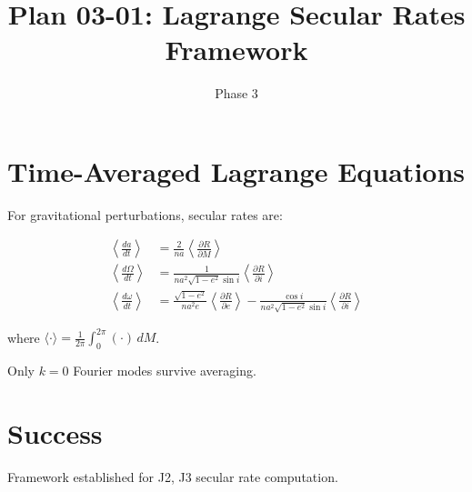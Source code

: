 \documentclass[11pt]{article}
\title{Plan 03-01: Lagrange Secular Rates Framework}
\date{Phase 3}
\begin{document}
\maketitle

\section{Time-Averaged Lagrange Equations}

For gravitational perturbations, secular rates are:

\begin{align}
\left\langle\frac{da}{dt}\right\rangle &= \frac{2}{na}\left\langle\frac{\partial R}{\partial M}\right\rangle\\
\left\langle\frac{d\Omega}{dt}\right\rangle &= \frac{1}{na^2\sqrt{1-e^2}\sin i}\left\langle\frac{\partial R}{\partial i}\right\rangle\\
\left\langle\frac{d\omega}{dt}\right\rangle &= \frac{\sqrt{1-e^2}}{na^2 e}\left\langle\frac{\partial R}{\partial e}\right\rangle - \frac{\cos i}{na^2\sqrt{1-e^2}\sin i}\left\langle\frac{\partial R}{\partial i}\right\rangle
\end{align}

where $\langle \cdot \rangle = \frac{1}{2\pi}\int_0^{2\pi} (\cdot)\, dM$.

Only $k=0$ Fourier modes survive averaging.

\section{Success}
Framework established for J2, J3 secular rate computation.
\end{document}
